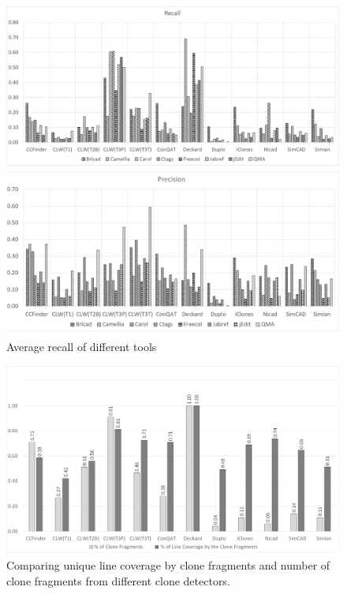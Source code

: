 \documentclass[review]{elsarticle}
\begin{document}
\begin{figure}
\centering
\includegraphics[width=\textwidth] {AveragePrecisionRecall.png}
\caption{Average recall of different tools}
\label{fig:AveragePrecisionRecall}
\end{figure}


\vspace{2mm}
\begin{figure}
\centering
\includegraphics[width=\textwidth] {AverageLineCoveredPerSS.png}
\caption{Comparing unique line coverage by clone fragments and number of clone fragments from different clone detectors.}
\label{fig:AverageLineCoveredPerSS}
\end{figure}
\end{document}
